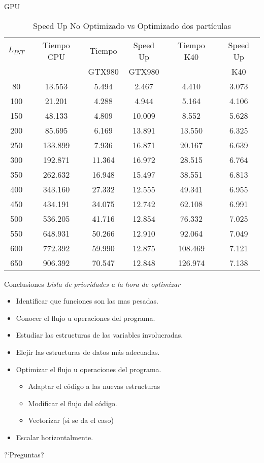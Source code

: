 \documentclass{beamer}
\begin{document}
\begin{frame}{GPU}{}
\begin{table}[h]
\begin{center}

\small
\begin{tabular}{ |c|c|c|c|c|c| }
  \hline
  $L_{INT}$ & Tiempo CPU &   Tiempo   & Speed Up & Tiempo K40 & Speed Up \\
               &            &   GTX980   &  GTX980  &            &    K40\\
  \hline
  80 & 13.553 & 5.494 & 2.467 & 4.410 & 3.073\\
  100 & 21.201 & 4.288 & 4.944 & 5.164 & 4.106\\
  150 & 48.133 & 4.809 & 10.009 & 8.552 & 5.628\\
  200 & 85.695 & 6.169 & 13.891 & 13.550 & 6.325\\
  250 & 133.899 & 7.936 & 16.871 & 20.167 & 6.639\\
  300 & 192.871 & 11.364 & 16.972 & 28.515 & 6.764\\
  350 & 262.632 & 16.948 & 15.497 & 38.551 & 6.813\\
  400 & 343.160 & 27.332 & 12.555 & 49.341 & 6.955\\
  450 & 434.191 & 34.075 & 12.742 & 62.108 & 6.991\\
  500 & 536.205 & 41.716 & 12.854 & 76.332 & 7.025\\
  550 & 648.931 & 50.266 & 12.910 & 92.064 & 7.049\\
  600 & 772.392 & 59.990 & 12.875 & 108.469 & 7.121\\
  650 & 906.392 & 70.547 & 12.848 & 126.974 & 7.138\\
  \hline
\end{tabular}
\caption{Speed Up No Optimizado vs Optimizado dos part\'iculas}
\label{table:speedupgpu}
\end{center}
\end{table}
\end{frame}

\begin{frame}{Conclusiones}{}
  \textit{Lista de prioridades a la hora de optimizar}
  \begin{itemize}
    \item Identificar que funciones son las mas pesadas.
    \item Conocer el flujo u operaciones del programa.
    \item Estudiar las estructuras de las variables involucradas.
    \item Elejir las estructuras de datos m\'as adecuadas.
    \item Optimizar el flujo u operaciones del programa.
      \begin{itemize}
        \item Adaptar el c\'odigo a las nuevas estructuras
        \item Modificar el flujo del c\'odigo.
        \item Vectorizar (si se da el caso)
      \end{itemize}
    \item Escalar horizontalmente.
  \end{itemize}
\end{frame}

\begin{frame}{?`Preguntas?}{}
\end{frame}
\end{document}
